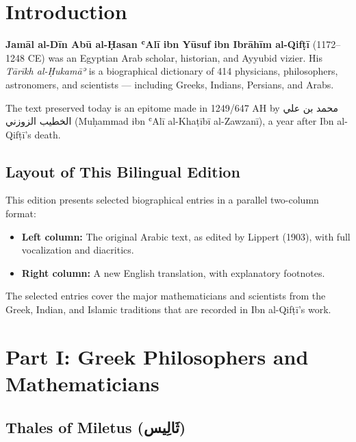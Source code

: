 \documentclass[11pt,a4paper]{article}
\def\RL#1{\beginR#1\endR}
\newcommand{\textarabic}[1]{{\arabicfont\RL{#1}}}
\begin{document}
\section*{Introduction}

\textbf{Jamāl al-Dīn Abū al-Ḥasan ʿAlī ibn Yūsuf ibn Ibrāhīm al-Qifṭī} (1172--1248 CE) was an Egyptian Arab scholar, historian, and Ayyubid vizier. His \textit{Tārīkh al-Ḥukamāʾ} is a biographical dictionary of 414 physicians, philosophers, astronomers, and scientists --- including Greeks, Indians, Persians, and Arabs.

The text preserved today is an epitome made in 1249/647 AH by \textarabic{محمد بن علي الخطيب الزوزني} (Muḥammad ibn ʿAlī al-Khaṭībī al-Zawzanī), a year after Ibn al-Qifṭī's death.

\subsection*{Layout of This Bilingual Edition}

This edition presents selected biographical entries in a parallel two-column format:
\begin{itemize}[leftmargin=2em]
  \item \textbf{Left column:} The original Arabic text, as edited by Lippert (1903), with full vocalization and diacritics.
  \item \textbf{Right column:} A new English translation, with explanatory footnotes.
\end{itemize}

The selected entries cover the major mathematicians and scientists from the Greek, Indian, and Islamic traditions that are recorded in Ibn al-Qifṭī's work.

\newpage

\section{Part I: Greek Philosophers and Mathematicians}
\label{sec:greek}

\subsection{Thales of Miletus (\textarabic{ثَالِيس})}
\end{document}
